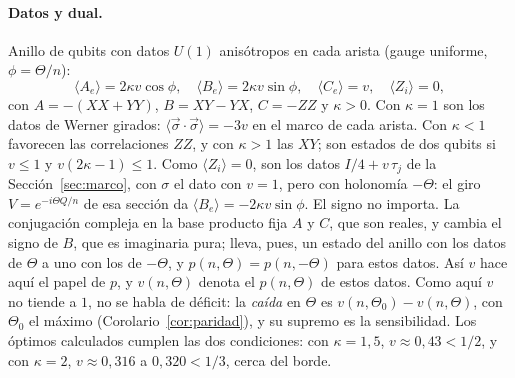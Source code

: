 \documentclass[11pt,a4paper]{article}
\theoremstyle{remark}
\newcommand{\ev}[1]{\langle #1\rangle}
\begin{document}
\paragraph{Datos y dual.} Anillo de qubits con datos $U(1)$ anisótropos en cada arista (gauge
uniforme, $\phi=\Theta/n$):
\[
  \ev{A_e}=2\kappa v\cos\phi,\quad \ev{B_e}=2\kappa v\sin\phi,\quad \ev{C_e}=v,\quad \ev{Z_i}=0,
\]
con $A=-(XX+YY)$, $B=XY-YX$, $C=-ZZ$ y $\kappa>0$. Con $\kappa=1$ son los datos de Werner
girados: $\ev{\vec\sigma\cdot\vec\sigma}=-3v$ en el marco de cada arista. Con $\kappa<1$ favorecen
las correlaciones $ZZ$, y con $\kappa>1$ las $XY$; son estados de dos qubits si $v\le1$ y
$v(2\kappa-1)\le1$. Como $\ev{Z_i}=0$, son los datos $I/4+v\,\tau_j$ de la Sección~\ref{sec:marco},
con $\sigma$ el dato con $v=1$, pero con holonomía $-\Theta$: el giro $V=e^{-i\Theta Q/n}$ de esa sección da
$\ev{B_e}=-2\kappa v\sin\phi$. El signo no importa. La conjugación compleja en la base producto fija $A$
y $C$, que son reales, y cambia el signo de $B$, que es imaginaria pura; lleva, pues, un estado del
anillo con los datos de $\Theta$ a uno con los de $-\Theta$, y $p(n,\Theta)=p(n,-\Theta)$ para estos datos.
Así $v$ hace aquí el papel de $p$, y $v(n,\Theta)$ denota el $p(n,\Theta)$ de estos datos. Como aquí $v$ no tiende a $1$, no se habla de déficit: la \emph{caída} en $\Theta$ es
$v(n,\Theta_0)-v(n,\Theta)$, con $\Theta_0$ el máximo (Corolario~\ref{cor:paridad}), y su supremo es la
sensibilidad. Los óptimos calculados cumplen las dos condiciones: con $\kappa=1{,}5$, $v\approx0{,}43<1/2$, y
con $\kappa=2$, $v\approx0{,}316$ a $0{,}320<1/3$, cerca del borde.
\end{document}
